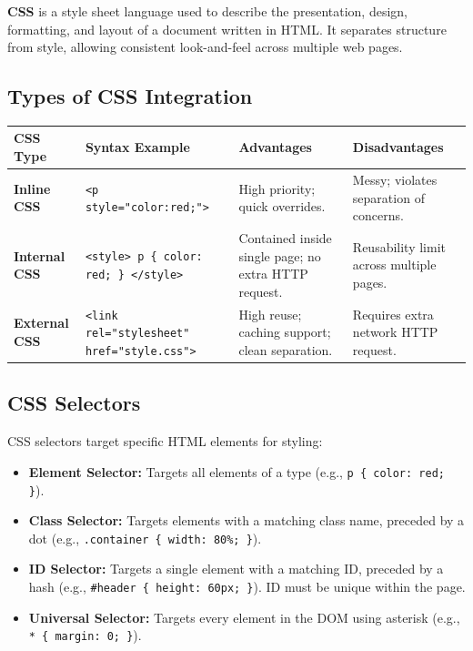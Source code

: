 \documentclass[12pt,a4paper]{article}
\renewcommand{\arraystretch}{1.45}
\begin{document}
\begin{tcolorbox}[defbox, title={\textbf{CSS --- Cascading Style Sheets}}]
\textbf{CSS} is a style sheet language used to describe the presentation, design, formatting, and layout of a document written in HTML. It separates structure from style, allowing consistent look-and-feel across multiple web pages.
\end{tcolorbox}

\subsection{Types of CSS Integration}

\par\noindent
{\renewcommand{\arraystretch}{1.5}%
\begin{tabularx}{\linewidth}{|B{3.0cm}|Y|Y|Y|}
\hline
\textbf{CSS Type} & \textbf{Syntax Example} & \textbf{Advantages} & \textbf{Disadvantages} \\
\hline
\textbf{Inline CSS} & \texttt{<p style="color:red;">} & High priority; quick overrides. & Messy; violates separation of concerns. \\
\hline
\textbf{Internal CSS} & \texttt{<style> p \{ color: red; \} </style>} & Contained inside single page; no extra HTTP request. & Reusability limit across multiple pages. \\
\hline
\textbf{External CSS} & \texttt{<link rel="stylesheet" href="style.css">} & High reuse; caching support; clean separation. & Requires extra network HTTP request. \\
\hline
\end{tabularx}}

\subsection{CSS Selectors}
CSS selectors target specific HTML elements for styling:
\begin{itemize}[leftmargin=*, itemsep=3pt]
  \item \textbf{Element Selector:} Targets all elements of a type (e.g., \texttt{p \{ color: red; \}}).
  \item \textbf{Class Selector:} Targets elements with a matching class name, preceded by a dot (e.g., \texttt{.container \{ width: 80\%; \}}).
  \item \textbf{ID Selector:} Targets a single element with a matching ID, preceded by a hash (e.g., \texttt{\#header \{ height: 60px; \}}). ID must be unique within the page.
  \item \textbf{Universal Selector:} Targets every element in the DOM using asterisk (e.g., \texttt{* \{ margin: 0; \}}).
\end{itemize}
\end{document}
